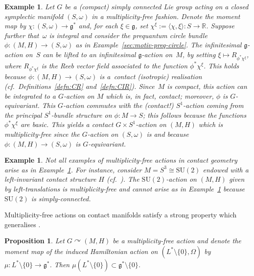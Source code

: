 \documentclass[10pt,a4paper]{amsart}
\numberwithin{equation}{section}
\newtheorem{Proposition}[Theorem]{Proposition}
\newtheorem{Example}[Theorem]{Example}
\newcommand{\CM}{(M,H)} %
\newcommand{\SM}{(S,\omega)} %
\newcommand{\SYM}{L^* \setminus \{0\}} %
\newcommand{\RR}{\mathbb{R}}
\begin{document}
\begin{Example}\label{exm:prequant_mult_free}
Let $G$ be a (compact) simply connected Lie group acting on a closed symplectic manifold $\SM$ in a multiplicity-free fashion. Denote the moment map by $\chi \colon \SM \to \mathfrak{g}^*$ and, for each $\xi \in \mathfrak{g}$, set $\chi^{\xi}:=\langle \chi,\xi \rangle \colon S \to \RR$. Suppose further that~$\omega$ is integral and consider the prequantum circle bundle $ \phi \colon \CM \to \SM$ as in Example~\ref{sec:motiv-preq-circle}. The inf\/initesimal $\mathfrak{g}$-action on~$S$ can be lifted to an inf\/initesimal $\mathfrak{g}$-action on~$M$, by setting $\xi \mapsto R_{\phi^* \chi^{\xi}}$, where $R_{\phi^* \chi^{\xi}}$ is the Reeb vector f\/ield associated to the function $\phi^*\chi^{\xi}$. This holds because $\phi \colon \CM \to \SM$ is a~{\em contact (isotropic) realisation} (cf.\ Def\/initions~\ref{defn:CR} and~\ref{defn:CIR}). Since~$M$ is compact, this action can be integrated to a $G$-action on $M$ which is, in fact, contact; moreover, $\phi$ is $G$-equivariant. This $G$-action commutes with the (contact!) $S^1$-action coming from the principal $S^1$-bundle structure on $\phi \colon M \to S$; this follows because the functions $\phi^*\chi^{\xi}$ are basic. This yields a contact $G \times S^1$-action on $\CM$ which is multiplicity-free since the $G$-action on $\SM$ is and because $\phi \colon \CM \to \SM$ is $G$-equivariant.
\end{Example}

\begin{Example}\label{exm:S3}
Not all examples of multiplicity-free actions in contact geometry arise as in Example~\ref{exm:prequant_mult_free}. For instance, consider $M = S^3 \cong \mathrm{SU}(2)$ endowed with a left-invariant contact structure $H$ (cf.~\cite{boothby_wang}). The $\mathrm{SU}(2)$-action on $\CM$ given by left-translations is multiplicity-free and cannot arise as in Example~\ref{exm:prequant_mult_free} because $\mathrm{SU}(2)$ is simply-connected.
\end{Example}

Multiplicity-free actions on contact manifolds satisfy a strong property which generalises \cite[Lemma~2.12]{lerman_contact_toric}.

\begin{Proposition}\label{lemma:mu_misses_zero}
Let $G \curvearrowright \CM$ be a multiplicity-free action and denote the moment map of the induced Hamiltonian action on $(\SYM,\Omega)$ by $\mu \colon \SYM \to \mathfrak{g}^*$. Then $\mu ( \SYM ) \subset \mathfrak{g}^* \setminus \{0\}$.
\end{Proposition}
\end{document}
